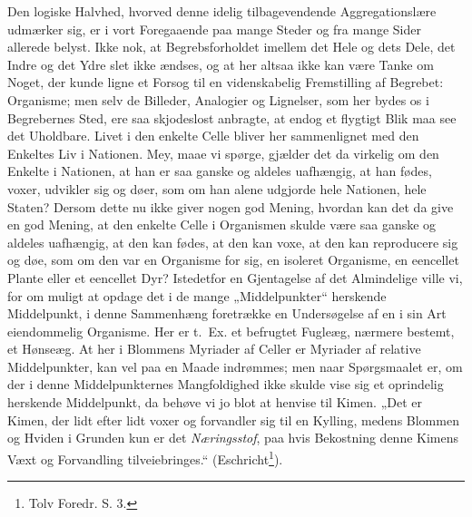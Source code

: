 \documentclass[11pt]{book}
\newcommand{\opage}[1]{\marginnote{\footnotesize\textit{[#1]}}}
\begin{document}
Den logiske Halvhed, hvorved denne idelig tilbagevendende
Aggregationslære udmærker sig, er i vort Foregaaende paa mange Steder
og fra mange Sider allerede belyst. Ikke nok, at Begrebsforholdet
imellem det Hele og dets Dele, det Indre og det Ydre slet ikke ændses,
og at her altsaa ikke kan være Tanke om Noget, der kunde ligne et
Forsog til en videnskabelig Fremstilling af Begrebet: Organisme; men
selv de Billeder, Analogier og Lignelser, som her bydes os i Begrebernes
Sted, ere saa skjodeslost anbragte, at endog et flygtigt Blik maa see
det Uholdbare. Livet i den enkelte Celle bliver her sammenlignet med
den Enkeltes Liv i Nationen. Mey, maae vi spørge, gjælder det da
virkelig om den Enkelte i Nationen, at han er saa ganske og aldeles
uafhængig, at han fødes, voxer, udvikler sig og døer, som om han alene
udgjorde hele Nationen, hele Staten? Dersom dette nu ikke giver nogen
god Mening, hvordan kan det da give en god Mening, at den enkelte
Celle i Organismen skulde være saa ganske og aldeles uafhængig, at den
kan fødes, at den kan voxe, at den kan reproducere sig og døe, som om
den var en Organisme for sig, en isoleret Organisme, en eencellet Plante
eller et eencellet Dyr? Istedetfor en Gjentagelse af det Almindelige
ville vi, for om muligt at opdage det i de mange „Middelpunkter“
herskende Middelpunkt, i denne Sammenhæng foretrække en Undersøgelse
af en i sin Art eiendommelig Organisme. Her er t.~Ex. et befrugtet
Fugleæg, nærmere bestemt, et Hønseæg. At her i Blommens Myriader
af Celler er Myriader af relative Middelpunkter, kan vel paa en Maade
indrømmes; men naar Spørgsmaalet er, om der i denne Middelpunkternes
Mangfoldighed ikke skulde vise sig et oprindelig herskende Middelpunkt,
da behøve vi jo blot at henvise til Kimen. „Det er Kimen, der lidt
efter lidt voxer og forvandler sig til en
\opage{345} \setcounter{footnote}{0}%
Kylling, medens Blommen og Hviden i Grunden kun er det
\emph{Næringsstof}, paa hvis Bekostning denne Kimens Væxt og Forvandling
tilveiebringes.“ (Eschricht\footnote{Tolv Foredr. S. 3.}).
\end{document}
